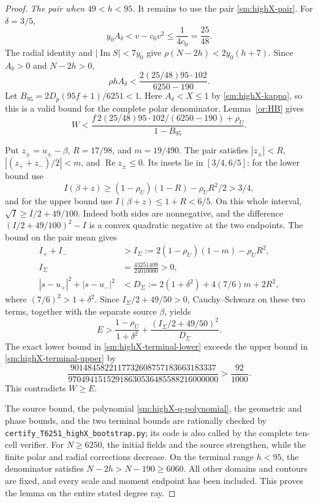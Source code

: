 \documentclass[11pt,reqno]{amsart}
\numberwithin{equation}{section}
\theoremstyle{definition}
\theoremstyle{remark}
\renewcommand{\Re}{\operatorname{Re}}
\renewcommand{\Im}{\operatorname{Im}}
\DeclareRobustCommand{\cert}[1]{\nolinkurl{#1}}
\begin{document}
\begin{proof}
\smallskip
\noindent\emph{The pair when $49<h<95$.}
It remains to use the pair \eqref{sm:highX-pair}.
For $\delta=3/5$,
\[
 y_0A_\delta<v-c_0v^2\le\frac1{4c_0}=\frac{25}{48}.
\]
The radial identity and $|\Im S|<7y_0$ give
$\rho(N-2h)<2y_0(h+7)$.
Since $A_\delta>0$ and $N-2h>0$,
\[
 \rho h A_\delta
 <\frac{2(25/48)95\cdot102}{6250-190}.
\]
Let $B_{95}=2D_p(95f+1)/6251<1$.
Here $A_\delta<X\le1$ by \eqref{sm:highX-kappa}, so this
is a valid bound for the complete polar denominator.
Lemma~\ref{or:HB} gives
\begin{equation}\label{sm:highX-terminal-upper}
 W<\frac{f\,2(25/48)95\cdot102/(6250-190)+\rho_U}{1-B_{95}}.
\end{equation}

Put $z_\pm=u_\pm-\beta$, $R=17/98$, and $m=19/490$.
The pair satisfies
$|z_\pm|<R$, $|(z_++z_-)/2|<m$, and $\Re z_\pm\le0$.
Its insets lie in $[3/4,6/5]$: for the lower bound use
\[
 I(\beta+z)\ge(1-\rho_U)(1-R)-\rho_UR^2/2>3/4,
\]
and for the upper bound use $I(\beta+z)\le1+R<6/5$.
On this whole interval,
$\sqrt I\ge I/2+49/100$.
Indeed both sides are nonnegative, and the difference
$(I/2+49/100)^2-I$ is a convex quadratic negative at
the two endpoints.
The bound on the pair mean gives
\begin{align*}
 I_++I_-&>I_\Sigma:=2(1-\rho_U)(1-m)-\rho_UR^2,\\
 I_\Sigma&=\frac{43251409}{24010000}>0,\\
 |s-u_+|^2+|s-u_-|^2
 &<D_\Sigma:=2(1+\delta^2)+4(7/6)m+2R^2,
\end{align*}
where $(7/6)^2>1+\delta^2$.
Since $I_\Sigma/2+49/50>0$, Cauchy--Schwarz on these two terms,
together with the separate source $\beta$, yields
\begin{equation}\label{sm:highX-terminal-lower}
 E>\frac{1-\rho_U}{1+\delta^2}
                    +\frac{(I_\Sigma/2+49/50)^2}{D_\Sigma}.
\end{equation}
The exact lower bound in \eqref{sm:highX-terminal-lower}
exceeds the upper bound in \eqref{sm:highX-terminal-upper} by
\[
 \frac{9014845822117732608757183663183337}
      {97049415152918630536485588216000000}>\frac{92}{1000}.
\]
This contradicts $W\ge E$.

The source bound, the polynomial
\eqref{sm:highX-q-polynomial}, the geometric and phase
bounds, and the two terminal bounds are rationally checked
by \cert{certify_T6251_highX_bootstrap.py}; its code is also
called by the complete ten-cell verifier.
For $N\ge6250$, the initial fields and the source strengthen,
while the finite polar and radial corrections decrease.
On the terminal range $h<95$, the denominator satisfies
$N-2h>N-190\ge6060$. All other
domains and contours are fixed, and every scale and moment
endpoint has been included. This proves the lemma on the
entire stated degree ray.
\end{proof}
\end{document}

